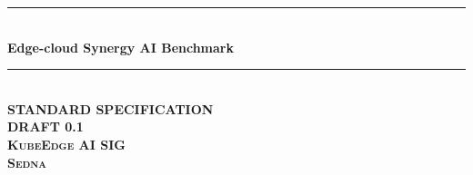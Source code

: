 \documentclass{book}
\newcommand{\HRule}{\rule{\linewidth}{0.5mm}} %
\begin{document}
\begin{titlepage}

\center %



\HRule \\[0.4cm]
{ \huge \bfseries Edge-cloud Synergy AI Benchmark}\\[0.4cm] %
\HRule \\[1.5cm]

\textsc{\huge \textbf{STANDARD SPECIFICATION}}\\[1.5cm]

\textsc{\Large \textbf{DRAFT 0.1 \\[0.07cm] KubeEdge AI SIG \\[0.24cm] Sedna}}\\[1.5cm]





\end{titlepage}
\end{document}
